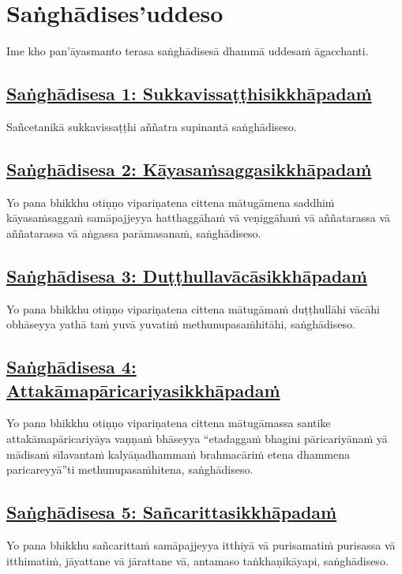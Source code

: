 \setsecheadstyle{\sectionFmt}
\section{Saṅghādises'uddeso}
\label{sd}

\begin{intro}
  Ime kho pan'āyasmanto terasa saṅghādisesā dhammā uddesaṁ āgacchanti.
\end{intro}

\subsection*{\hyperref[comm1]{Saṅghādisesa 1: Sukkavissaṭṭhisikkhāpadaṁ}}
\label{sd1}
Sañcetanikā sukkavissaṭṭhi aññatra supinantā saṅghādiseso.

\subsection*{\hyperref[comm2]{Saṅghādisesa 2: Kāyasaṁsaggasikkhāpadaṁ}}
\label{sd2}
Yo pana bhikkhu otiṇṇo vipariṇatena cittena mātugāmena saddhiṁ kāyasaṁsaggaṁ samāpajjeyya hatthaggāhaṁ vā veṇiggāhaṁ vā aññatarassa vā aññatarassa vā aṅgassa parāmasanaṁ, saṅghādiseso.

\subsection*{\hyperref[comm3]{Saṅghādisesa 3: Duṭṭhullavācāsikkhāpadaṁ}}
\label{sd3}
Yo pana bhikkhu otiṇṇo vipariṇatena cittena mātugāmaṁ duṭṭhullāhi vācāhi obhāseyya yathā taṁ yuvā yuvatiṁ methunupasaṁhitāhi, saṅghādiseso.

\subsection*{\hyperref[comm4]{Saṅghādisesa 4: Attakāmapāricariyasikkhāpadaṁ}}
\label{sd4}
Yo pana bhikkhu otiṇṇo vipariṇatena cittena mātugāmassa santike attakāmapāricariyāya vaṇṇaṁ bhāseyya “etadaggaṁ bhagini pāricariyānaṁ yā mādisaṁ sīlavantaṁ kalyāṇadhammaṁ brahmacāriṁ etena dhammena paricareyyā”ti methunupasaṁhitena, saṅghādiseso.

\subsection*{\hyperref[comm5]{Saṅghādisesa 5: Sañcarittasikkhāpadaṁ}}
\label{sd5}
Yo pana bhikkhu sañcarittaṁ samāpajjeyya itthiyā vā purisamatiṁ purisassa vā itthimatiṁ, jāyattane vā jārattane vā, antamaso taṅkhaṇikāyapi, saṅghādiseso.

